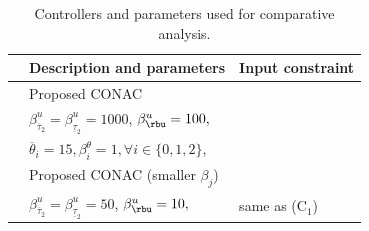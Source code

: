 \documentclass[letterpaper, journal]{IEEEtran}
\providecommand{\DIFaddbeginFL}{} %
\providecommand{\DIFaddendFL}{} %
\providecommand{\DIFdelbeginFL}{} %
\providecommand{\DIFdelendFL}{} %
\begin{document}
\begin{table}[t]
  \renewcommand{\arraystretch}{1.3}
  \caption{Controllers and parameters used for comparative analysis.}
  \label{table:controller}
  \centering
  \begin{tabular}{m{.6cm} m{4cm} m{2.7cm}}
  \hline
    &\bf{Description and parameters}&\bf{Input constraint}\\
  \hline
  \hline
    \DIFdelbeginFL %
\DIFdelendFL \DIFaddbeginFL {}\DIFaddendFL & Proposed CONAC  
    & 
      \DIFdelbeginFL %
\DIFdelendFL \DIFaddbeginFL {}
    \DIFaddendFL \\
    & $\beta^{u}_{\overline{\tau}_2}=\beta^{u}_{\underline{\tau}_2}=1000$, $\beta^{u}_{\rbu}=100,$ & 
    \\
    & 
    $\overline{\theta}_i=15,\beta_i^\theta=1,\forall i\in\{0,1,2\}$,
    &
    \\
  \hline
    & Proposed CONAC (smaller $\beta_j$) &  
    \\
    & $\beta^{u}_{\overline{\tau}_2}=\beta^{u}_{\underline{\tau}_2}=50$, $\beta^{u}_{\rbu}=10,$ & same as (C$_1$) 
    \\ 

\end{tabular}
\end{table}
\end{document}
